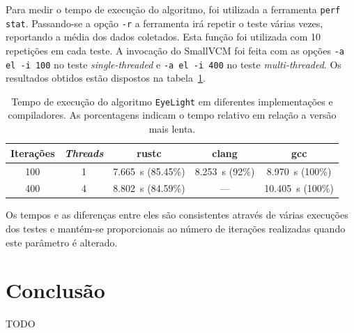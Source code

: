 \documentclass[tg]{mdtufsm}
\newcommand{\todo}[1]{\textsf{\color{red}#1}}
\begin{document}
Para medir o tempo de execução do algoritmo, foi utilizada a ferramenta \texttt{perf stat}. Passando-se a opção \texttt{-r} a ferramenta irá repetir o teste várias vezes, reportando a média dos dados coletados. Esta função foi utilizada com 10 repetições em cada teste. A invocação do SmallVCM foi feita com as opções \texttt{-a el -i 100} no teste \emph{single-threaded} e \texttt{-a el -i 400} no teste \emph{multi-threaded}. Os resultados obtidos estão dispostos na tabela~\ref{tab:vcm-timings}.

\begin{table}
	\centering
	\begin{tabular}{c|c|c|c|c}
	Iterações & \emph{Threads} & rustc & clang & gcc \\ \hline
	100 & 1 & \SI{7.665}{\s} (85.45\%) & \SI{8.253}{\s} (92\%) & \SI{ 8.970}{\s} (100\%) \\
	400 & 4 & \SI{8.802}{\s} (84.59\%) & ---                   & \SI{10.405}{\s} (100\%) \\
	\end{tabular}
	\caption[Tempo de execução do algoritmo \texttt{EyeLight} em diferentes implementações e compiladores.]{
		Tempo de execução do algoritmo \texttt{EyeLight} em diferentes implementações e compiladores. As porcentagens indicam o tempo relativo em relação a versão mais lenta.
	}
	\label{tab:vcm-timings}
\end{table}

Os tempos e as diferenças entre eles são consistentes através de várias execuções dos testes e mantém-se proporcionais ao número de iterações realizadas quando este parâmetro é alterado.

\chapter{Conclusão}

\todo{TODO}

\setlength{\baselineskip}{\baselineskip}


\end{document}
